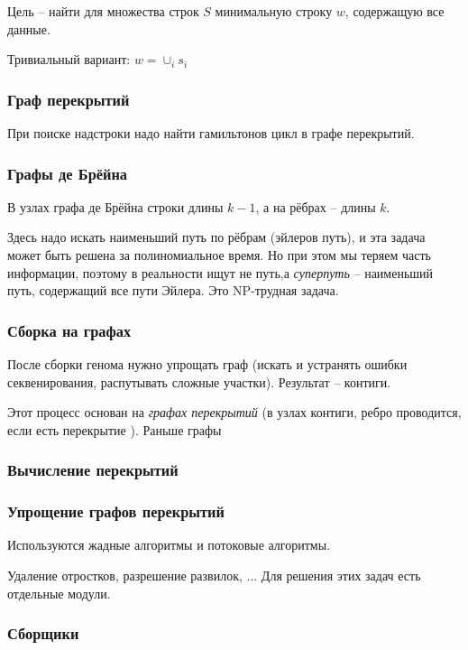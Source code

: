 \documentclass[main.tex]{subfiles}
\begin{document}
Цель -- найти для множества строк $ S $ минимальную строку $ w $, содержащую все данные.

Тривиальный вариант: $ w = \cup_i s_i $

\subsubsection{Граф перекрытий}
При поиске надстроки надо найти гамильтонов цикл в графе перекрытий.

\subsubsection{Графы де Брёйна}

В узлах графа де Брёйна строки длины $ k -1 $, а на рёбрах -- длины $ k $.

Здесь надо искать наименьший путь по рёбрам (эйлеров путь), и эта задача может быть решена за полиномиальное время.
Но при этом мы теряем часть информации, поэтому в реальности ищут не путь,а \emph{суперпуть} -- наименьший путь, содержащий все пути Эйлера.
Это NP-трудная задача.


\subsubsection{Сборка на графах}

После сборки генома нужно упрощать граф (искать и устранять ошибки секвенирования, распутывать сложные участки).
Результат -- контиги.

Этот процесс основан на \emph{ графах перекрытий } (в узлах контиги, ребро проводится, если есть перекрытие ).
Раньше графы

\subsubsection{ Вычисление перекрытий }


\subsubsection{Упрощение графов перекрытий}

Используются жадные алгоритмы и потоковые алгоритмы.

Удаление отростков, разрешение развилок, ...
Для решения этих задач есть отдельные модули.

\subsubsection{Сборщики}
\end{document}
